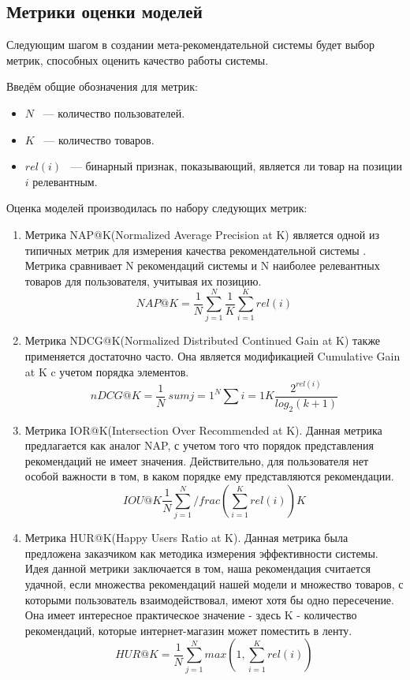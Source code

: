 \documentclass[14pt]{mmcs_article}
\begin{document}
\subsection{Метрики оценки моделей}
Следующим шагом в создании мета-рекомендательной системы будет выбор метрик, способных оценить качество работы системы.

Введём общие обозначения для метрик:
\begin{itemize}
	\item $N$  ~--- количество пользователей.
	\item $K$  ~--- количество товаров.
	\item $rel(i)$ ~--- бинарный признак, показывающий, является ли товар на позиции $i$ релевантным.
\end{itemize}


Оценка моделей производилась по набору следующих метрик:
\begin{enumerate}
	\item Метрика NAP@K(Normalized Average Precision at K) является одной из типичных метрик для измерения качества рекомендательной системы \cite{stud:kimfalk1}. Метрика сравнивает N рекомендаций системы и N наиболее релевантных товаров для пользователя, учитывая их позицию. 
	\begin{equation}
		NAP@K = \frac{1}{N} \sum_{j=1}^{N} \frac{1}{K}\sum_{i=1}^{K}rel(i)
	\end{equation}
	\item Метрика NDCG@K(Normalized Distributed Continued Gain at K) также применяется достаточно часто. Она является модификацией Cumulative Gain at K c учетом порядка элементов.
	\begin{equation}
		nDCG@K= \frac{1}{N} \ sum{j=1}^N \sum{i=1}{K} \frac{2^{rel(i)} }{log_2(k+1)} 	
    \end{equation}   
	\item Метрика IOR@K(Intersection Over Recommended at K). Данная метрика предлагается как аналог NAP, с учетом того что порядок представления рекомендаций не имеет значения. Действительно, для пользователя нет особой важности в том, в каком порядке ему представляются рекомендации.
	\begin{equation}
		IOU@K \frac{1}{N} \sum_{j=1}^N  /frac{(\sum_{i=1}^{K} rel(i))}{K} 
	\end{equation} 
	\item Метрика HUR@K(Happy Users Ratio at K). Данная метрика была предложена заказчиком как методика измерения эффективности системы. Идея данной метрики заключается в том, наша рекомендация считается удачной, если множества рекомендаций нашей модели и множество товаров, с которыми пользователь взаимодействовал,  имеют хотя бы одно пересечение. Она имеет интересное практическое значение - здесь K - количество рекомендаций, которые интернет-магазин может поместить в ленту.
	\begin{equation}
	   HUR@K = \frac{1}{N}\sum_{j=1}^{N} max(1,\sum_{i=1}^{K} rel(i)) 		
	\end{equation}
\end{enumerate}
\end{document}
